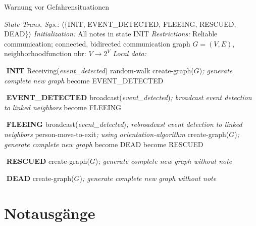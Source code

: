 \begin{algorithm}
\caption{Warnung vor Gefahrensituationen}
\begin{algorithmic} 
\STATE \textit{State Trans. Sys.:} $\langle\{$INIT, EVENT{\_}DETECTED, FLEEING, RESCUED, DEAD$\}\rangle$
\STATE \textit{Initialization:} All notes in state INIT
\STATE \textit{Restrictions:} Reliable communication; connected, bidirected communication graph $G = (V,E)$, neighborhoodfunction nbr: $V \rightarrow 2^{V}$
\STATE \textit{Local data:}

\STATE $ $
\STATE \textbf{INIT}
\STATE Receiving(\textit{event{\_}detected})
\STATE random-walk
\STATE create-graph($G$)\hfill\emph{; generate complete new graph}
\ENDWHILE
\STATE become EVENT{\_}DETECTED


\STATE $ $
\STATE \textbf{EVENT{\_}DETECTED}
\STATE broadcast(\textit{event{\_}detected})\hfill\emph{; broadcast event detection to linked neighbors}
\STATE become FLEEING

\STATE $ $
\STATE \textbf{FLEEING}
\STATE broadcast(\textit{event{\_}detected})\hfill\emph{; rebroadcast event detection to linked neighbors}
\STATE person-move-to-exit\hfill\emph{; using orientation-algorithm}
\STATE create-graph($G$)\hfill\emph{; generate complete new graph}
\STATE become DEAD
\ENDIF
\ENDWHILE
\STATE become RESCUED

\STATE $ $
\STATE \textbf{RESCUED}
\STATE create-graph($G$)\hfill\emph{; generate complete new graph without note}

\STATE $ $
\STATE \textbf{DEAD}
\STATE create-graph($G$)\hfill\emph{; generate complete new graph without note}

\end{algorithmic}
\end{algorithm}

\section{Notausgänge}
\label{sec:notausgaenge}

